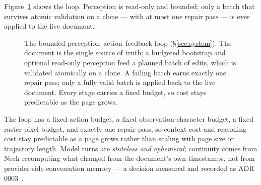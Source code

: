 \documentclass[11pt]{article}
\begin{document}
Figure~\ref{fig:loop} shows the loop. Perception is read-only and bounded; only
a batch that survives atomic validation on a clone --- with at most one repair
pass --- is ever applied to the live document.

\begin{figure}[t]
\centering
{}
\caption{The bounded perception--action--feedback loop
(\S\ref{sec:system}). The document is the single source of truth; a budgeted
bootstrap and optional read-only perception feed a planned batch of edits, which
is validated atomically on a clone. A failing batch earns exactly one repair
pass; only a fully valid batch is applied back to the live document. Every stage
carries a fixed budget, so cost stays predictable as the page grows.}
\label{fig:loop}
\end{figure}

The loop has a fixed action budget, a fixed observation-character budget, a
fixed raster-pixel budget, and exactly one repair pass, so context cost and
reasoning cost stay predictable as a page grows rather than scaling with page
size or trajectory length. Model turns are \emph{stateless and ephemeral};
continuity comes from Neeh recomputing what changed from the document's own
timestamps, not from provider-side conversation memory --- a decision measured
and recorded as ADR 0003~\cite{adr3}.
\end{document}
